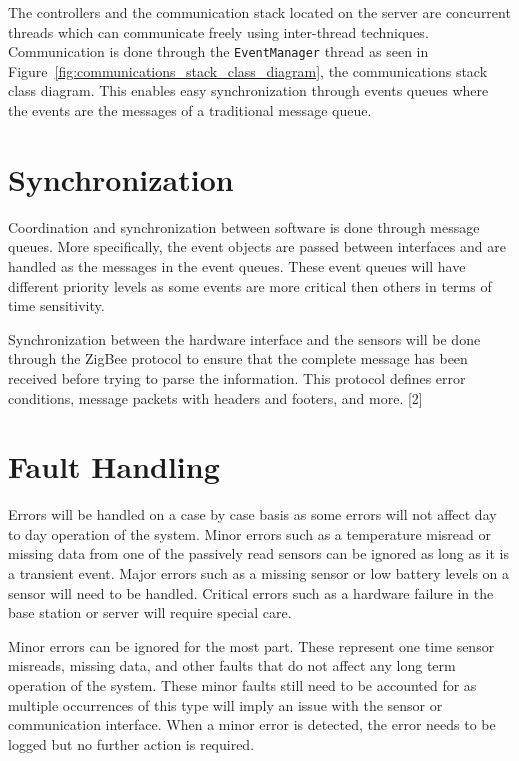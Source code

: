 \documentclass{report}
\begin{document}
The controllers and the communication stack located on the server are
concurrent threads which can communicate freely using inter-thread techniques.
Communication is done through the \texttt{EventManager} thread as seen in
Figure~\ref{fig:communications_stack_class_diagram}, the communications stack
class diagram. This enables easy synchronization through events queues where
the events are the messages of a traditional message queue.

\section{Synchronization}

Coordination and synchronization between software is done through message
queues. More specifically, the event objects are passed between interfaces and
are handled as the messages in the event queues. These event queues will
have different priority levels as some events are more critical then others in
terms of time sensitivity. 

Synchronization between the hardware interface and the sensors will be done
through the ZigBee protocol to ensure that the complete message has been
received before trying to parse the information. This protocol defines error
conditions, message packets with headers and footers, and more. [2]


\section{Fault Handling}
Errors will be handled on a case by case basis as some errors will not affect
day to day operation of the system. Minor errors such as a temperature misread
or missing data from one of the passively read sensors can be ignored as long
as it is a transient event. Major errors such as a missing sensor or low
battery levels on a sensor will need to be handled. Critical errors such as a
hardware failure in the base station or server will require special care.

Minor errors can be ignored for the most part. These represent one time sensor
misreads, missing data, and other faults that do not affect any long term
operation of the system. These minor faults still need to be accounted for as
multiple occurrences of this type will imply an issue with the sensor or
communication interface. When a minor error is detected, the error needs to be
logged but no further action is required.
\end{document}
